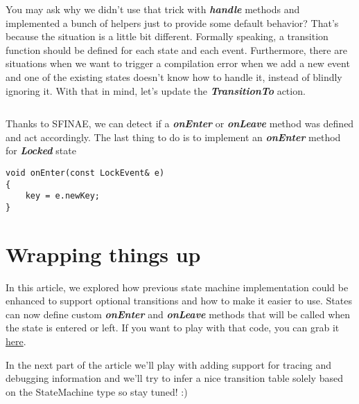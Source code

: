 \documentclass{article}[8pt]
\newcommand{\code}[1]{\textbf{\textit{#1}}}
\newcommand{\locked}{\code{Locked}}
\begin{document}
You may ask why we didn't use that trick with \code{handle} methods and implemented a bunch of helpers just to provide some default behavior? That's because the situation is a little bit different. Formally speaking, a transition function should be defined for each state and each event. Furthermore, there are situations when we want to trigger a compilation error when we add a new event and one of the existing states doesn't know how to handle it, instead of blindly ignoring it. With that in mind, let's update the \code{TransitionTo} action.

\bigskip
\inputminted[firstline=3]{c++}{../fsm/actions/TransitionTo.h}
\bigskip

Thanks to SFINAE, we can detect if a \code{onEnter} or \code{onLeave} method was defined and act accordingly. The last thing to do is to implement an \code{onEnter} method for \locked{} state

\bigskip
\begin{verbatim}
void onEnter(const LockEvent& e)
{
    key = e.newKey;
}
\end{verbatim}
\bigskip

\section*{Wrapping things up}
In this article, we explored how previous state machine implementation could be enhanced to support optional transitions and how to make it easier to use. States can now define custom \code{onEnter} and \code{onLeave} methods that will be called when the state is entered or left. If you want to play with that code, you can grab it \href{https://github.com/AdamsPL/state-machine}{here}.

In the next part of the article we'll play with adding support for tracing and debugging information and we'll try to infer a nice transition table solely based on the StateMachine type so stay tuned! :)
\end{document}
